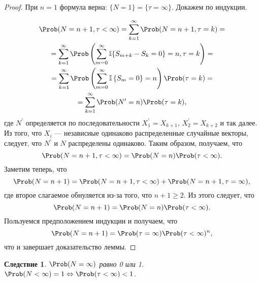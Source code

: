 \documentclass[a4paper]{article}
\theoremstyle{plain}
\newtheorem*{cor}{Следствие}
\theoremstyle{definition}
\theoremstyle{remark}
\begin{document}
\begin{proof}
  При $n = 1$ формула верна: $\lbrace N = 1 \rbrace = \lbrace \tau = \infty \rbrace$. Докажем по индукции.

  \begin{multline*}
    \Prob(N = n+1, \tau < \infty) = \sum_{k=1}^{\infty} \Prob(N = n+1, \tau = k) =\\
    = \sum_{k=1}^{\infty} \Prob\left( \sum_{m=0}^{\infty} \mathbb{I} \lbrace S_{m+k} - S_{k} = 0 \rbrace = n, \tau = k\right) =\\
    = \sum_{k=1}^{\infty} \Prob\left( \sum\limits_{m=0}^{\infty} \mathbb{I} \left\lbrace S_{m} = 0 \right\rbrace = n\right)\Prob(\tau = k) =\\
    = \sum\limits_{k=1}^{\infty} \Prob(N^{\prime} = n)\Prob(\tau = k),
  \end{multline*}
  где $N^{\prime}$ определяется по последовательности $X_{1}^{\prime} = X_{k+1}$, $X_{2}^{\prime} = X_{k+2}$ и так далее. Из того, что $X_{i}$ --- независиые одинаково распределенные случайные векторы, следует, что $N^{\prime}$ и $N$ распределены одинаково. Таким образом, получаем, что
  \begin{equation*}
    \Prob(N = n+1, \tau < \infty) = \Prob(N = n)\Prob(\tau < \infty).
  \end{equation*}
  Заметим теперь, что
  \begin{equation*}
    \Prob(N = n+1) = \Prob(N = n+1, \tau < \infty) + \Prob(N = n+1, \tau = \infty),
  \end{equation*}
  где второе слагаемое обнуляется из-за того, что $n+1 \geqslant 2$. Из этого следует, что
  \begin{equation*}
    \Prob(N = n+1) = \Prob(N = n)\Prob(\tau < \infty).
  \end{equation*}
  Пользуемся предположением индукции и получаем, что
  \begin{equation*}
    \Prob(N = n+1) = \Prob(\tau = \infty)\Prob(\tau < \infty)^{n},
  \end{equation*}
  что и завершает доказательство леммы.
\end{proof}

\begin{cor}
  $\Prob(N = \infty)$ равно 0 или 1. $\Prob(N < \infty) = 1 \Leftrightarrow \Prob(\tau < \infty) < 1$.
\end{cor}
\end{document}
